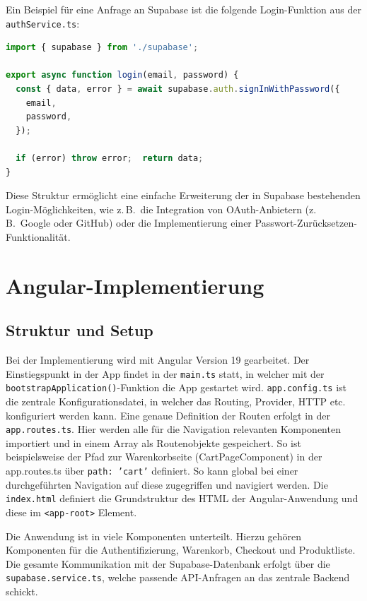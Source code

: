 \documentclass[oneside]{ausarbeitung}
\begin{document}
Ein Beispiel für eine Anfrage an Supabase ist die folgende Login-Funktion aus der \texttt{authService.ts}:

\begin{lstlisting}[language=TypeScript, caption={Login-Funktion im \texttt{authService.ts}}]
import { supabase } from './supabase';

export async function login(email, password) {
  const { data, error } = await supabase.auth.signInWithPassword({
    email,
    password,
  });

  if (error) throw error;  return data;
}
\end{lstlisting}

Diese Struktur ermöglicht eine einfache Erweiterung der in Supabase bestehenden Login-Möglichkeiten, wie z.\,B.\ die Integration von OAuth-Anbietern (z.\,B.\ Google oder GitHub) oder die Implementierung einer Passwort-Zurücksetzen-Funktionalität.

\section{Angular-Implementierung}
\subsection{Struktur und Setup}

Bei der Implementierung wird mit Angular Version 19 gearbeitet. Der Einstiegspunkt in der App findet in der \texttt{main.ts} statt, in welcher mit der \texttt{bootstrapApplication()}-Funktion die App gestartet wird. \texttt{app.config.ts} ist die zentrale Konfigurationsdatei, in welcher das Routing, Provider, HTTP etc. konfiguriert werden kann. Eine genaue Definition der Routen erfolgt in der \texttt{app.routes.ts}. Hier werden alle für die Navigation relevanten Komponenten importiert und in einem Array als Routenobjekte gespeichert. So ist beispielsweise der Pfad zur Warenkorbseite (CartPageComponent) in der app.routes.ts über \texttt{path: 'cart'} definiert. So kann global bei einer durchgeführten Navigation auf diese zugegriffen und navigiert werden. Die \texttt{index.html} definiert die Grundstruktur des HTML der Angular-Anwendung und diese im \texttt{<app-root>} Element.

Die Anwendung ist in viele Komponenten unterteilt. Hierzu gehören Komponenten für die Authentifizierung, Warenkorb, Checkout und Produktliste. Die gesamte Kommunikation mit der Supabase-Datenbank erfolgt über die \texttt{supabase.service.ts}, welche passende API-Anfragen an das zentrale Backend schickt.
\end{document}
